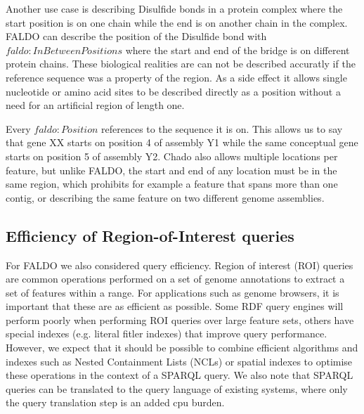 Another use case is describing Disulfide bonds in a protein complex where the start position is on one chain while the end is on another chain in the complex. FALDO can describe the position of the Disulfide bond with $faldo:InBetweenPositions$ where the start and end of the bridge is on different protein chains.
These biological realities are can not be described accuratly if the reference sequence was a property of the region. 
As a side effect it allows single nucleotide or amino acid sites to be described directly as a position without a need for an artificial region of length one.

Every $faldo:Position$ references to the sequence it is on. This allows us to say that gene XX starts on position 4 of assembly Y1 while the same conceptual gene starts on position 5 of assembly Y2. Chado also allows multiple locations per feature, but unlike FALDO, the start and end of
any location must be in the same region, which prohibits for example a feature that spans more than one contig, or describing the same feature on two different genome assemblies.

\subsection*{Efficiency of Region-of-Interest queries}

For FALDO we also considered query efficiency. 
Region of interest (ROI) queries are common operations performed on a
set of genome annotations to extract a set of features within a
range. For applications such as genome browsers, it is important that
these are as efficient as possible. Some RDF query engines will
perform poorly when performing ROI queries over large feature
sets, others have special indexes (e.g. literal fitler indexes) 
that improve query performance. However, we expect that it should be possible to combine
efficient algorithms and indexes such as Nested Containment Lists
(NCLs)\cite{NCL2007} or spatial indexes to optimise these operations
in the context of a SPARQL query. We also note that SPARQL queries can
be translated to the query language of existing systems, where only 
the query translation step is an added cpu burden.



